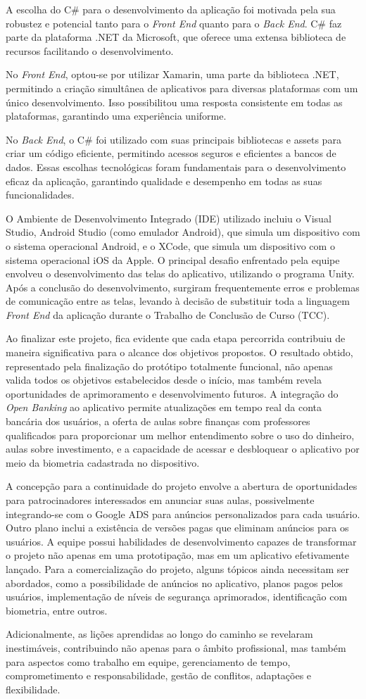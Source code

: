 A escolha do C\# para o desenvolvimento da aplicação foi motivada pela sua robustez e potencial tanto para o \textit{Front End} quanto para o \textit{Back End}. C\# faz parte da plataforma .NET da Microsoft, que oferece uma extensa biblioteca de recursos facilitando o desenvolvimento.

No \textit{Front End}, optou-se por utilizar Xamarin, uma parte da biblioteca .NET, permitindo a criação simultânea de aplicativos para diversas plataformas com um único desenvolvimento. Isso possibilitou uma resposta consistente em todas as plataformas, garantindo uma experiência uniforme.

No \textit{Back End}, o C\# foi utilizado com suas principais bibliotecas e assets para criar um código eficiente, permitindo acessos seguros e eficientes a bancos de dados. Essas escolhas tecnológicas foram fundamentais para o desenvolvimento eficaz da aplicação, garantindo qualidade e desempenho em todas as suas funcionalidades.

O Ambiente de Desenvolvimento Integrado (IDE) utilizado incluiu o Visual Studio, Android Studio (como emulador Android), que simula um dispositivo com o sistema operacional Android, e o XCode, que simula um dispositivo com o sistema operacional iOS da Apple. O principal desafio enfrentado pela equipe envolveu o desenvolvimento das telas do aplicativo, utilizando o programa Unity. Após a conclusão do desenvolvimento, surgiram frequentemente erros e problemas de comunicação entre as telas, levando à decisão de substituir toda a linguagem \textit{Front End} da aplicação durante o Trabalho de Conclusão de Curso (TCC).

Ao finalizar este projeto, fica evidente que cada etapa percorrida contribuiu de maneira significativa para o alcance dos objetivos propostos. O resultado obtido, representado pela finalização do protótipo totalmente funcional, não apenas valida todos os objetivos estabelecidos desde o início, mas também revela oportunidades de aprimoramento e desenvolvimento futuros. A integração do \textit{Open Banking} ao aplicativo permite atualizações em tempo real da conta bancária dos usuários, a oferta de aulas sobre finanças com professores qualificados para proporcionar um melhor entendimento sobre o uso do dinheiro, aulas sobre investimento, e a capacidade de acessar e desbloquear o aplicativo por meio da biometria cadastrada no dispositivo.

A concepção para a continuidade do projeto envolve a abertura de oportunidades para patrocinadores interessados em anunciar suas aulas, possivelmente integrando-se com o Google ADS para anúncios personalizados para cada usuário. Outro plano inclui a existência de versões pagas que eliminam anúncios para os usuários. A equipe possui habilidades de desenvolvimento capazes de transformar o projeto não apenas em uma prototipação, mas em um aplicativo efetivamente lançado. Para a comercialização do projeto, alguns tópicos ainda necessitam ser abordados, como a possibilidade de anúncios no aplicativo, planos pagos pelos usuários, implementação de níveis de segurança aprimorados, identificação com biometria, entre outros.

Adicionalmente, as lições aprendidas ao longo do caminho se revelaram inestimáveis, contribuindo não apenas para o âmbito profissional, mas também para aspectos como trabalho em equipe, gerenciamento de tempo, comprometimento e responsabilidade, gestão de conflitos, adaptações e flexibilidade.